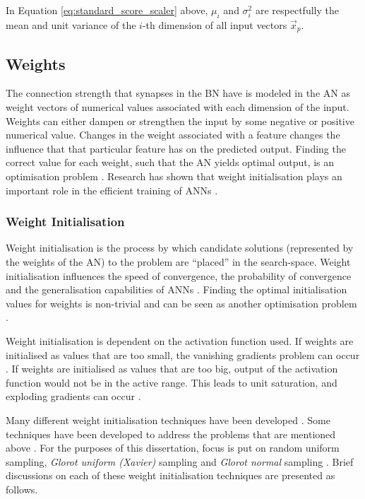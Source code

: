 \noindent
In Equation \eqref{eq:standard_score_scaler} above, $\mu_i$ and $\sigma^2_i$ are respectfully the mean and unit variance of the $i$-th dimension of all input vectors $\vec{x}_p$.

\subsection{Weights}\label{sec:anns:an:weights}

The connection strength that synapses in the \acs{BN} have is modeled in the \ac{AN} as weight vectors of numerical values associated with each dimension of the input. Weights can either dampen or strengthen the input by some negative or positive numerical value. Changes in the weight associated with a feature changes the influence that that particular feature has on the predicted output. Finding the correct value for each weight, such that the \ac{AN} yields optimal output, is an optimisation problem \cite{ref:thierens:1993}. Research has shown that weight initialisation plays an important role in the efficient training of \acp{ANN} \cite{ref:thimm:1995}.

\subsubsection{Weight Initialisation}\label{sec:anns:an:weights:initialisation}

Weight initialisation is the process by which candidate solutions (represented by the weights of the \ac{AN}) to the problem are ``placed'' in the search-space. Weight initialisation influences the speed of convergence, the probability of convergence and the generalisation capabilities of \acp{ANN} \cite{ref:fernandez:2001}. Finding the optimal initialisation values for weights is non-trivial and can be seen as another optimisation problem \cite{ref:de:2016, ref:erdogmus:2003, ref:yam:2000}.

Weight initialisation is dependent on the activation function used. If weights are initialised as values that are too small, the vanishing gradients problem can occur \cite{ref:hanin:2018}. If weights are initialised as values that are too big, output of the activation function would not be in the active range. This leads to unit saturation, and exploding gradients can occur \cite{ref:hanin:2018, ref:yadav:2018}.

Many different weight initialisation techniques have been developed \cite{ref:erdogmus:2003}. Some techniques have been developed to address the problems that are mentioned above \cite{ref:yadav:2018}. For the purposes of this dissertation, focus is put on random uniform sampling, \textit{Glorot uniform (Xavier)} sampling and \textit{Glorot normal} sampling \cite{ref:glorot:2010}. Brief discussions on each of these weight initialisation techniques are presented as follows.


